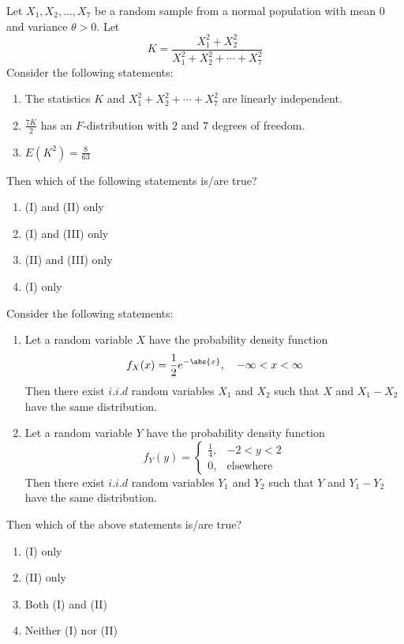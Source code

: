 \iffalse
\chapter{2022}
\author{EE24BTECH11019 - Dwarak A}
\section{st}
\fi


    \item Let $X_1, X_2, \dots, X_7$ be a random sample from a normal population with mean $0$ and variance $\theta > 0$. Let $$K = \frac{X_1^2+X_2^2}{X_1^2+X_2^2+\cdots+X_7^2}$$ Consider the following statements:
        \begin{enumerate}[label = (\Roman*)]
            \item The statistics $K$ and $X_1^2+X_2^2+\cdots+X_7^2$ are linearly independent.
            \item $\frac{7K}{2}$ has an $F$-distribution with $2$ and $7$ degrees of freedom.
            \item $E(K^2)=\frac{8}{63}$
        \end{enumerate}
        Then which of the following statements is/are true?
        \begin{enumerate}
            \item (I) and (II) only 
            \item (I) and (III) only 
            \item (II) and (III) only 
            \item (I) only 
        \end{enumerate}

    \item Consider the following statements:
        \begin{enumerate}[label = (\Roman*)]
            \item Let a random variable $X$ have the probability density function $$f_{X}(x)=\frac{1}{2}e^{-\abs{x}},\quad-\infty<x<\infty$$ Then there exist $i.i.d$ random variables $X_1$ and $X_2$ such that $X$ and $X_1-X_2$ have the same distribution.
            \item Let a random variable $Y$ have the probability density function $$f_{Y}(y)=
                \begin{cases}
                    \frac{1}{4}, & -2<y<2 \\
                    0, & \text{elsewhere}
                \end{cases}$$
                Then there exist $i.i.d$ random variables $Y_1$ and $Y_2$ such that $Y$ and $Y_1-Y_2$ have the same distribution.
        \end{enumerate}
        Then which of the above statements is/are true?
        \begin{enumerate}
            \item (I) only 
            \item (II) only 
            \item Both (I) and (II)
            \item Neither (I) nor (II) 
        \end{enumerate}
    
